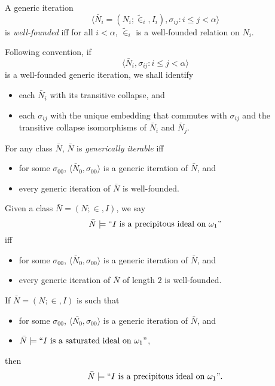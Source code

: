 \documentclass[12pt]{article}
\numberwithin{equation}{section}
\begin{document}
\begin{defi}
A generic iteration $$\langle \bar{N}_i = (N_i; \tilde{\in}_i, I_i), \sigma_{ij} : i \leq j < \alpha \rangle$$ is \emph{well-founded} iff for all $i < \alpha$, $\tilde{\in}_i$ is a well-founded relation on $N_i$.
\end{defi}

Following convention, if $$\langle \bar{N}_i, \sigma_{ij} : i \leq j < \alpha \rangle$$ is a well-founded generic iteration, we shall identify 
\begin{itemize}
    \item each $\bar{N}_i$ with its transitive collapse, and
    \item each $\sigma_{ij}$ with the unique embedding that commutes with $\sigma_{ij}$ and the transitive collapse isomorphisms of $\bar{N}_i$ and $\bar{N}_j$.
\end{itemize}

\begin{defi}
For any class $\bar{N}$, $\bar{N}$ is \emph{generically iterable} iff  
\begin{itemize}
    \item for some $\sigma_{00}$, $\langle \bar{N}_0, \sigma_{00} \rangle$ is a generic iteration of $\bar{N}$, and
    \item every generic iteration of $\bar{N}$ is well-founded.
\end{itemize}
\end{defi}

\begin{defi}
Given a class $\bar{N} = (N; \in, I)$, we say 
\begin{equation*}
    \bar{N} \models ``I \text{ is a precipitous ideal on } \omega_1"
\end{equation*}
iff
\begin{itemize}
    \item for some $\sigma_{00}$, $\langle \bar{N}_0, \sigma_{00} \rangle$ is a generic iteration of $\bar{N}$, and
    \item every generic iteration of $\bar{N}$ of length $2$ is well-founded.
\end{itemize}
\end{defi}

\begin{fact}\label{satipre}
If $\bar{N} = (N; \in, I)$ is such that 
\begin{itemize}
    \item for some $\sigma_{00}$, $\langle \bar{N_0}, \sigma_{00} \rangle$ is a generic iteration of $\bar{N}$, and
    \item $\bar{N} \models ``I \text{ is a saturated ideal on } \omega_1"$,
\end{itemize}
then
\begin{equation*}
    \bar{N} \models ``I \text{ is a precipitous ideal on } \omega_1".
\end{equation*}
\end{fact}
\end{document}
